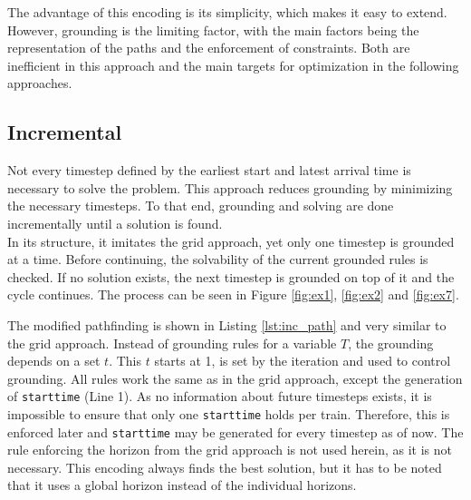 \documentclass{llncs}
\begin{document}
\begin{multicols*}{2}
The advantage of this encoding is its simplicity, which makes it easy to extend. However, grounding is the limiting factor, with the main factors being the representation of the paths and the enforcement of constraints. Both are inefficient in this approach and the main targets for optimization in the following approaches.

\subsection*{Incremental}
\begin{figure}[t]
    
    
\end{figure}
\begin{figure}[b]
    
\end{figure}

Not every timestep defined by the earliest start and latest arrival time is necessary to solve the problem. This approach reduces grounding by minimizing the necessary timesteps. To that end, grounding and solving are done incrementally until a solution is found.\\

In its structure, it imitates the grid approach, yet only one timestep is grounded at a time. Before continuing, the solvability of the current grounded rules is checked. If no solution exists, the next timestep is grounded on top of it and the cycle continues. The process can be seen in Figure \ref{fig:ex1}, \ref{fig:ex2} and \ref{fig:ex7}.

The modified pathfinding is shown in Listing \ref{lst:inc_path} and very similar to the grid approach. Instead of grounding rules for a variable $T$, the grounding depends on a set $t$. This $t$ starts at 1, is set by the iteration and used to control grounding. All rules work the same as in the grid approach, except the generation of \texttt{starttime} (Line 1). As no information about future timesteps exists, it is impossible to ensure that only one \texttt{starttime} holds per train. Therefore, this is enforced later and \texttt{starttime} may be generated for every timestep as of now. The rule enforcing the horizon from the grid approach is not used herein, as it is not necessary. This encoding always finds the best solution, but it has to be noted that it uses a global horizon instead of the individual horizons.


\end{multicols*}
\end{document}
